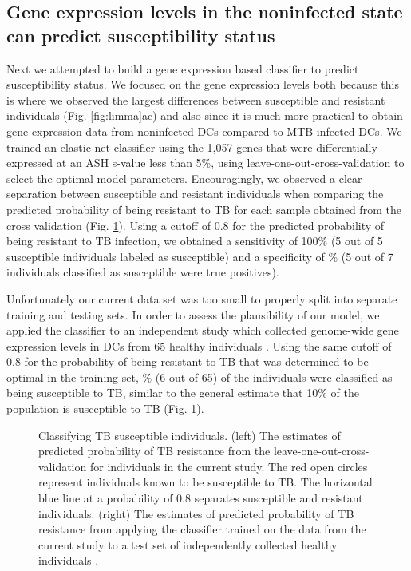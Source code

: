 \documentclass[fleqn,10pt]{wlscirep}
\begin{document}
\subsection*{Gene expression levels in the noninfected state can predict susceptibility status}

Next we attempted to build a gene expression based classifier to predict susceptibility status. We focused on the gene expression levels both because this is where we observed the largest differences between susceptible and resistant individuals (Fig. \ref{fig:limma}ac) and also since it is much more practical to obtain gene expression data from noninfected DCs compared to MTB-infected DCs. We trained an elastic net classifier using the 1,057 genes that were differentially expressed at an ASH s-value \cite{Stephens2016} less than 5\%, using leave-one-out-cross-validation to select the optimal model parameters. Encouragingly, we observed a clear separation between susceptible and resistant individuals when comparing the predicted probability of being resistant to TB for each sample obtained from the cross validation (Fig. \ref{fig:classifier}). Using a cutoff of 0.8 for the predicted probability of being resistant to TB infection, we obtained a sensitivity of 100\% (5 out of 5 susceptible individuals labeled as susceptible) and a specificity of \% (5 out of 7 individuals classified as susceptible were true positives).

Unfortunately our current data set was too small to properly split into separate training and testing sets. In order to assess the plausibility of our model, we applied the classifier to an independent study which collected genome-wide gene expression levels in DCs from 65 healthy individuals \cite{Barreiro2012}. Using the same cutoff of 0.8 for the probability of being resistant to TB that was determined to be optimal in the training set, \% (6 out of 65) of the individuals were classified as being susceptible to TB, similar to the general estimate that 10\% of the population is susceptible to TB (Fig. \ref{fig:classifier}).

\begin{figure}[ht]
\centering
\caption{
Classifying TB susceptible individuals. (left) The  estimates of predicted probability of TB resistance from the leave-one-out-cross-validation for individuals in the current study. The red open circles represent individuals known to be susceptible to TB. The horizontal blue line at a probability of 0.8 separates susceptible and resistant individuals. (right) The estimates of predicted probability of TB resistance from applying the classifier trained on the data from the current study to a test set of independently collected healthy individuals \cite{Barreiro2012}.
}
\label{fig:classifier}
\end{figure}
\end{document}
